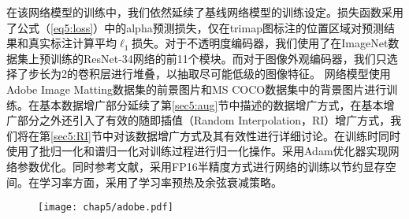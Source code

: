 在该网络模型的训练中，我们依然延续了基线网络模型的训练设定。损失函数采用了公式（\ref{eq5:loss}）中的alpha预测损失，仅在trimap图标注的位置区域对预测结果和真实标注计算平均$\ell_1$损失。对于不透明度编码器，我们使用了在ImageNet数据集\cite{russakovsky2015imagenet}上预训练的ResNet-34网络\cite{he2016deep}的前11个模块。而对于图像外观编码器，我们只选择了步长为2的卷积层进行堆叠，以抽取尽可能低级的图像特征。
网络模型使用Adobe Image Matting数据集\cite{xu2017deep}的前景图片和MS COCO数据集中的背景图片进行训练\cite{lin2014microsoft}。在基本数据增广部分延续了第\ref{sec5:aug}节中描述的数据增广方式，在基本增广部分之外还引入了有效的随即插值（Random Interpolation，RI）增广方式，我们将在第\ref{sec5:RI}节中对该数据增广方式及其有效性进行详细讨论。在训练时同时使用了批归一化\cite{ioffe2015batch}和谱归一化\cite{miyato2018spectral}对训练过程进行归一化操作。采用Adam优化器\cite{kingma2014adam}实现网络参数优化。同时参考文献\parencite{he2019bag}，采用FP16半精度方式进行网络的训练以节约显存空间。在学习率方面，采用了学习率预热\cite{goyal2017accurate}及余弦衰减\cite{loshchilov2016sgdr}策略。

\begin{figure}[t]
	\centering
	\texttt{[image: chap5/adobe.pdf]}
	\label{fig5:adobe}
\end{figure}




